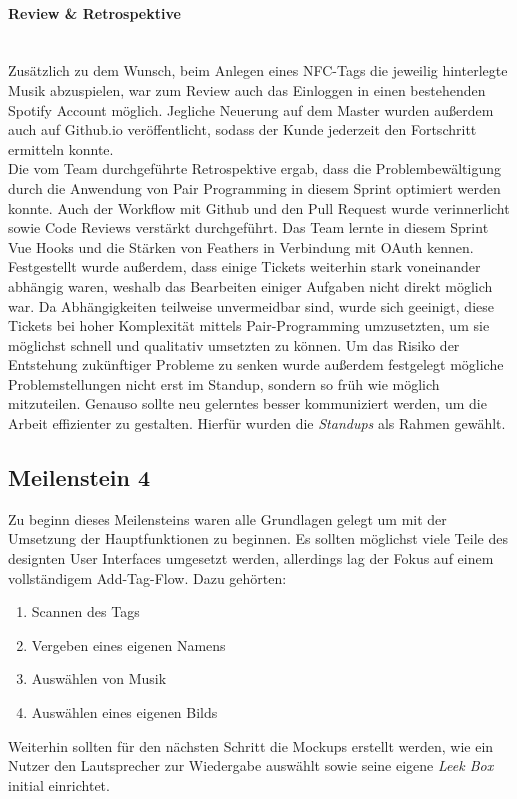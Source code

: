 \documentclass[10pt, a4paper]{article}
\begin{document}
\begin{onehalfspace}
\paragraph*{Review \& Retrospektive} $~$ \\
Zusätzlich zu dem Wunsch, beim Anlegen eines NFC-Tags die jeweilig hinterlegte Musik abzuspielen, war zum Review auch das Einloggen
in einen bestehenden Spotify Account möglich. Jegliche Neuerung auf dem Master wurden außerdem auch auf Github.io veröffentlicht, sodass der Kunde jederzeit
den Fortschritt ermitteln konnte.
\\
Die vom Team durchgeführte Retrospektive ergab, dass die Problembewältigung durch die Anwendung von Pair Programming in diesem Sprint optimiert werden konnte.
Auch der Workflow mit Github und den Pull Request wurde verinnerlicht sowie Code Reviews verstärkt durchgeführt. Das Team lernte in diesem Sprint
Vue Hooks und die Stärken von Feathers in Verbindung mit OAuth kennen. Festgestellt wurde außerdem, dass einige Tickets weiterhin stark voneinander abhängig waren,
weshalb das Bearbeiten einiger Aufgaben nicht direkt möglich war. Da Abhängigkeiten teilweise unvermeidbar sind, wurde sich geeinigt, diese Tickets bei hoher
Komplexität mittels Pair-Programming umzusetzten, um sie möglichst schnell und qualitativ umsetzten zu können. Um das Risiko der Entstehung zukünftiger Probleme
zu senken wurde außerdem festgelegt mögliche Problemstellungen nicht erst im Standup, sondern so früh wie möglich mitzuteilen. Genauso sollte neu gelerntes besser
kommuniziert werden, um die Arbeit effizienter zu gestalten. Hierfür wurden die \textit{Standups} als Rahmen gewählt.

\subsection{Meilenstein 4}
Zu beginn dieses Meilensteins waren alle Grundlagen gelegt um mit der Umsetzung der Hauptfunktionen zu beginnen.
Es sollten möglichst viele Teile des designten User Interfaces umgesetzt werden, allerdings lag der Fokus auf einem vollständigem \glqq Add-Tag-Flow\grqq.
Dazu gehörten:
\begin{enumerate}
  \item Scannen des Tags
  \item Vergeben eines eigenen Namens
  \item Auswählen von Musik
  \item Auswählen eines eigenen Bilds
\end{enumerate}
Weiterhin sollten für den nächsten Schritt die Mockups erstellt werden, wie ein Nutzer den Lautsprecher zur Wiedergabe auswählt sowie seine eigene \textit{Leek Box} initial einrichtet.


\end{onehalfspace}
\end{document}
